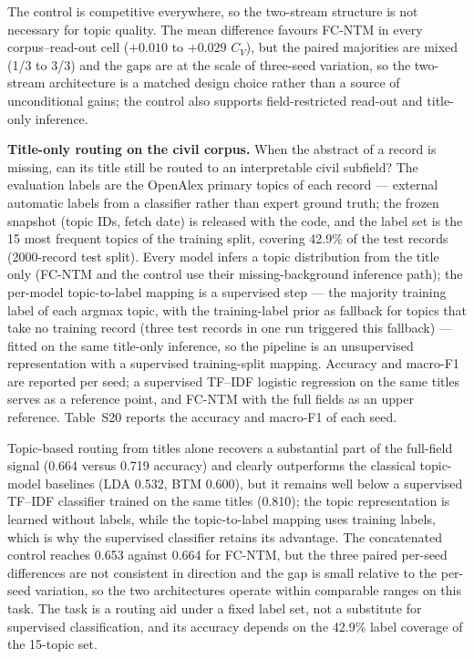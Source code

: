 \documentclass[Journal,letterpaper,NoLists]{ascelike-new}
\begin{document}
The control is competitive everywhere, so the two-stream structure is not necessary for topic
quality. The mean difference favours FC-NTM in every corpus--read-out cell ($+0.010$ to
$+0.029$ $C_V$), but the paired majorities are mixed (1/3 to 3/3) and the gaps are at the scale of
three-seed variation, so the two-stream architecture is a matched design choice rather than a
source of unconditional gains; the control also supports field-restricted read-out and title-only
inference.

\noindent\textbf{Title-only routing on the civil corpus.} When the abstract of a record is missing, can its title still be routed to an interpretable civil
subfield? The evaluation labels are the OpenAlex primary topics of each record --- external
automatic labels from a classifier rather than expert ground truth; the frozen snapshot (topic
IDs, fetch date) is released with the code, and the label set is the 15 most frequent topics of
the training split, covering 42.9\% of the test records (2000-record test split). Every model
infers a topic distribution from the title only (FC-NTM and the control use their
missing-background inference path); the per-model topic-to-label mapping is a supervised step ---
the majority training label of each argmax topic, with the training-label prior as fallback for
topics that take no training record (three test records in one run triggered this fallback) ---
fitted on the same title-only inference, so the pipeline is an unsupervised representation with
a supervised training-split mapping. Accuracy and
macro-F1 are reported per seed; a supervised TF--IDF logistic regression on the same titles
serves as a reference point, and FC-NTM with the full fields as an upper reference.
Table~S20 reports the accuracy and macro-F1 of each seed.

Topic-based routing from titles alone recovers a substantial part of the full-field signal
(0.664 versus 0.719 accuracy) and clearly outperforms the classical topic-model baselines
(LDA 0.532, BTM 0.600), but it remains well below a supervised TF--IDF classifier trained on the
same titles (0.810); the topic representation is learned without labels, while the topic-to-label
mapping uses training labels, which is why the supervised classifier retains its advantage. The
concatenated control reaches 0.653 against 0.664 for FC-NTM, but the three paired per-seed
differences are not consistent in direction and the gap is small relative to the per-seed
variation, so the two architectures operate within comparable ranges on this task. The task
is a routing aid under a fixed label set, not a substitute for supervised classification, and
its accuracy depends on the 42.9\% label coverage of the 15-topic set.
\end{document}
